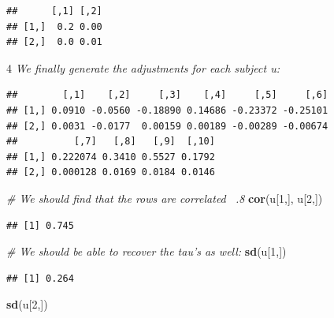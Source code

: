 \documentclass[12pt,]{krantz}
\newenvironment{Shaded}{\begin{snugshade}}{\end{snugshade}}
\newcommand{\KeywordTok}[1]{\textcolor[rgb]{0.13,0.29,0.53}{\textbf{#1}}}
\newcommand{\DecValTok}[1]{\textcolor[rgb]{0.00,0.00,0.81}{#1}}
\newcommand{\StringTok}[1]{\textcolor[rgb]{0.31,0.60,0.02}{#1}}
\newcommand{\CommentTok}[1]{\textcolor[rgb]{0.56,0.35,0.01}{\textit{#1}}}
\newcommand{\OperatorTok}[1]{\textcolor[rgb]{0.81,0.36,0.00}{\textbf{#1}}}
\newcommand{\NormalTok}[1]{#1}
\theoremstyle{definition}
\theoremstyle{definition}
\theoremstyle{definition}
\theoremstyle{remark}
\begin{document}
\begin{verbatim}
##      [,1] [,2]
## [1,]  0.2 0.00
## [2,]  0.0 0.01
\end{verbatim}

4 \emph{We finally generate the adjustments for each subject u:}

\begin{Shaded}
\end{Shaded}

\begin{verbatim}
##        [,1]    [,2]     [,3]    [,4]     [,5]     [,6]
## [1,] 0.0910 -0.0560 -0.18890 0.14686 -0.23372 -0.25101
## [2,] 0.0031 -0.0177  0.00159 0.00189 -0.00289 -0.00674
##          [,7]   [,8]   [,9]  [,10]
## [1,] 0.222074 0.3410 0.5527 0.1792
## [2,] 0.000128 0.0169 0.0184 0.0146
\end{verbatim}

\begin{Shaded}
\begin{Highlighting}[]
 \CommentTok{# We should find that the rows are correlated ~.8}
 \KeywordTok{cor}\NormalTok{(u[}\DecValTok{1}\NormalTok{,], u[}\DecValTok{2}\NormalTok{,])}
\end{Highlighting}
\end{Shaded}

\begin{verbatim}
## [1] 0.745
\end{verbatim}

\begin{Shaded}
\begin{Highlighting}[]
 \CommentTok{# We should be able to recover the tau's as well:}
 \KeywordTok{sd}\NormalTok{(u[}\DecValTok{1}\NormalTok{,])}
\end{Highlighting}
\end{Shaded}

\begin{verbatim}
## [1] 0.264
\end{verbatim}

\begin{Shaded}
\begin{Highlighting}[]
 \KeywordTok{sd}\NormalTok{(u[}\DecValTok{2}\NormalTok{,])}
\end{Highlighting}
\end{Shaded}
\end{document}
